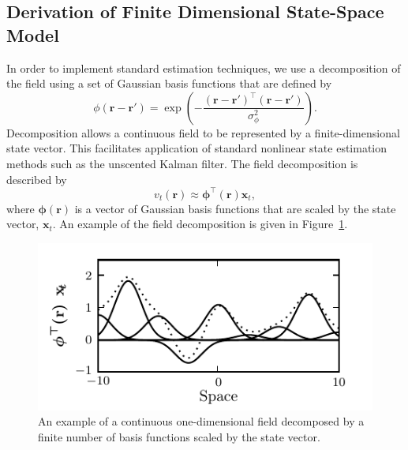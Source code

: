 \documentclass[10pt]{article}
\begin{document}
\subsection{Derivation of Finite Dimensional State-Space Model}\label{Sect:ReducedModelDerivation}
In order to implement standard estimation techniques, we use a decomposition of the field using a set of Gaussian basis functions that are defined by
\begin{equation}\label{eq:FieldBasisFunction}
	\phi\left(\mathbf{r}-\mathbf{r}'\right) =
\exp{\left(-\frac{(\mathbf{r}-\mathbf{r}')^\top(\mathbf{r}-\mathbf{r}')}{\sigma_{\phi}^2}\right)}. 
\end{equation}
Decomposition allows a continuous field to be represented by a finite-dimensional state vector. This facilitates application of standard nonlinear state estimation methods such as the unscented Kalman filter. The field decomposition is described by 
\begin{equation}
	\label{DefFieldDecomp} v_t\left(\mathbf{r}\right) \approx \mathbf{\phi}^{\top}\left(\mathbf{r}\right) \mathbf{x}_t, 
\end{equation}
where $\mathbf{\boldsymbol{\phi}}(\mathbf{r})$ is a vector of Gaussian basis functions that are scaled by the state vector, $\mathbf{x}_t$. An example of the field decomposition is given in Figure~\ref{fig:FieldDecomposition}.%
\begin{figure}
   	\begin{center}
   		\includegraphics{./Graph/FieldDecomposition.pdf} 
   	\end{center}
   	\caption{An example of a continuous one-dimensional field decomposed by a finite number of basis functions scaled by the state vector.} 
	\label{fig:FieldDecomposition}
   \end{figure}
\end{document}
